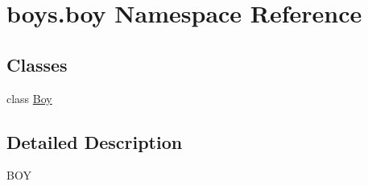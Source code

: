 \hypertarget{namespaceboys_1_1boy}{}\section{boys.\+boy Namespace Reference}
\label{namespaceboys_1_1boy}
\subsection*{Classes}
\begin{DoxyCompactItemize}
\item 
class \hyperlink{classboys_1_1boy_1_1_boy}{Boy}
\end{DoxyCompactItemize}


\subsection{Detailed Description}
\begin{DoxyVerb}BOY\end{DoxyVerb}
 